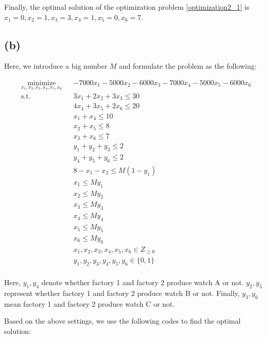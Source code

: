\documentclass[12pt,letterpaper]{article}
\begin{document}
Finally, the optimal solution of the optimization problem \ref{optimization2_1} is $x_1 = 0, x_2 = 1, x_3 = 3, x_4 = 1, x_5 = 0, x_6 = 7$.

\subsection*{(b)}

Here, we introduce a big number $M$ and formulate the problem as the following:

\begin{equation}
\begin{aligned}
& \underset{x_1, x_2, x_3, x_4, x_5, x_6}{\text{minimize}}
& & -7000x_1 - 5000x_2 - 6000x_3 - 7000x_4 - 5000x_5 - 6000x_6 \\
& \text{s.t.} & &  3x_1+2x_2+3x_3 \leq 30 \\
& & & 4x_4+3x_5+2x_6 \leq 20 \\
& & &  x_1 + x_4 \leq 10 \\
& & &  x_2 + x_5 \leq 8 \\
& & &  x_3 + x_6 \leq 7 \\
& & &  y_1 + y_2 + y_3 \leq 2 \\
& & &  y_4 + y_5 + y_6 \leq 2 \\
& & &  8 - x_1 -x_2 \leq M(1-y_1) \\
& & &  x_1 \leq My_1 \\
& & &  x_2 \leq My_2 \\
& & &  x_3 \leq My_3 \\
& & &  x_4 \leq My_4 \\
& & &  x_5 \leq My_5 \\
& & &  x_6 \leq My_6 \\
& & &  x_1, x_2, x_3, x_4, x_5, x_6 \in Z_{\geq 0} \\
& & &  y_1, y_2, y_3, y_4, y_5, y_6 \in \{0, 1\} \\
\end{aligned}
\label{optimization2_2}
\end{equation}

Here, $y_1, y_4$ denote whether factory 1 and factory 2 produce watch A or not. $y_2, y_5$ represent whether factory 1 and factory 2 produce watch B or not. Finally, $y_3, y_6$  mean factory 1 and factory 2 produce watch C or not.

Based on the above settings, we use the following codes to find the optimal solution:
\end{document}
